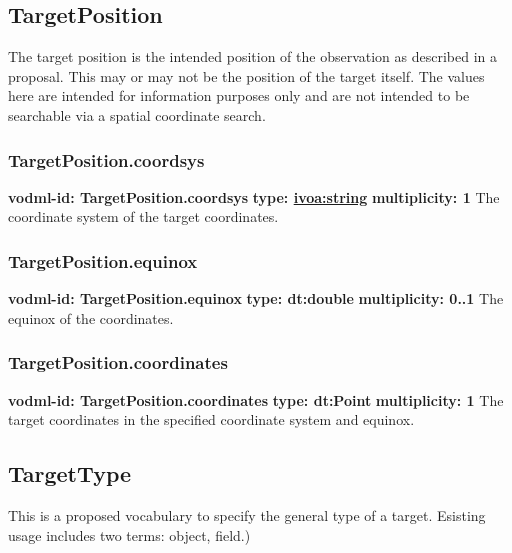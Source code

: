   \subsection{TargetPosition}
  \label{sect:TargetPosition}
    The target position is the intended position of the observation as described in a proposal. This may or may not be the position of the target itself. The values here are intended for information purposes only and are not intended to be searchable via a spatial coordinate search.

    \subsubsection{TargetPosition.coordsys}
      \textbf{vodml-id: TargetPosition.coordsys} \newline
      \textbf{type: \hyperref[sect:ivoa]{ivoa:string}} \newline
      \textbf{multiplicity: 1} \newline
      The coordinate system of the target coordinates.

    \subsubsection{TargetPosition.equinox}
      \textbf{vodml-id: TargetPosition.equinox} \newline
      \textbf{type: dt:double} \newline
      \textbf{multiplicity: 0..1} \newline
      The equinox of the coordinates.

    \subsubsection{TargetPosition.coordinates}
      \textbf{vodml-id: TargetPosition.coordinates} \newline
      \textbf{type: dt:Point} \newline
      \textbf{multiplicity: 1} \newline
      The target coordinates in the specified coordinate system and equinox.

  \subsection{TargetType}
  \label{sect:TargetType}
    This is a proposed vocabulary to specify the general type of a target. Esisting usage includes two terms: object, field.)

